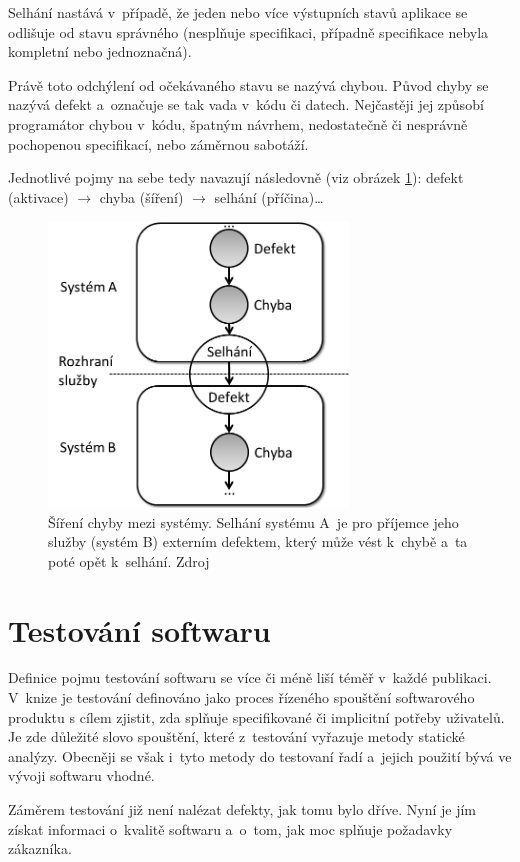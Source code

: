 	Selhání nastává v~případě, že jeden nebo více výstupních stavů aplikace se odlišuje od stavu správného (nesplňuje specifikaci, případně specifikace nebyla kompletní nebo jednoznačná).
	
	Právě toto odchýlení od očekávaného stavu se nazývá chybou. Původ chyby se nazývá defekt a~označuje se tak vada v~kódu či datech. Nejčastěji jej způsobí programátor chybou v~kódu, špatným návrhem, nedostatečně či nesprávně pochopenou specifikací, nebo záměrnou sabotáží.
	
	Jednotlivé pojmy na sebe tedy navazují následovně (viz obrázek \ref{Bug}): defekt (aktivace) $\to$ chyba (šíření) $\to$ selhání (příčina)\dots
	\begin{figure}[ht!]
		\centering
		\caption{Šíření chyby mezi systémy. Selhání systému A~je pro příjemce jeho služby (systém B) externím defektem, který může vést k~chybě a~ta poté opět  k~selhání. Zdroj \citep{RizeniKvalitySW}}
		\label{Bug}
		\includegraphics[width=8cm]{img/Bug.png}
	\end{figure}
	
	\section{Testování softwaru}
	Definice pojmu testování softwaru se více či méně liší téměř v~každé publikaci. V~knize \citep{RizeniKvalitySW} je testování definováno jako proces řízeného spouštění softwarového produktu s cílem zjistit, zda splňuje specifikované či implicitní potřeby uživatelů. Je zde důležité slovo spouštění, které z~testování vyřazuje metody statické analýzy. Obecněji se však i~tyto metody do testovaní řadí a~jejich použití bývá ve vývoji softwaru vhodné.
	
	Záměrem testování již není nalézat defekty, jak tomu bylo dříve. Nyní je jím získat informaci o~kvalitě softwaru a~o~tom, jak moc splňuje požadavky zákazníka.
	
